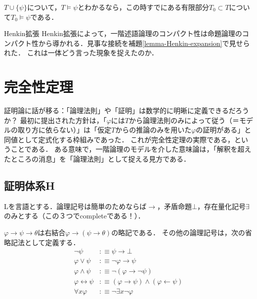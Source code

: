 \documentclass[uplatex, dvipdfmx]{jsreport}
\begin{document}
\begin{corollary}
    $T\cup\{\psi\}$について，$T\vDash\psi$とわかるなら，この時すでにある有限部分$T_0\subset T$について$T_0\vDash\psi$である．
\end{corollary}

\begin{itembox}[l]{Henkin拡張}
    Henkin拡張によって，一階述語論理のコンパクト性は命題論理のコンパクト性から導かれる．見事な接続を補題\ref{lemma-Henkin-expansion}で見せられた．
    これは一体どう言った現象を捉えたのか．
\end{itembox}

\section{完全性定理}

証明論に話が移る：「論理法則」や「証明」は数学的に明晰に定義できるだろうか？
最初に提出された方針は，「$\varphi$には$T$から論理法則のみによって従う（＝モデルの取り方に依らない）」は「仮定$T$からの推論のみを用いた$\varphi$の証明がある」と同値として定式化する枠組みであった．
これが完全性定理の実際である，ということである．
ある意味で，一階論理のモデルを介した意味論は，「解釈を超えたところの消息」を「論理法則」として捉える見方である．

\subsection{証明体系H}

\begin{notation}
    Lを言語とする．論理記号は簡単のためならば$\to$，矛盾命題$\bot$，存在量化記号$\exists$のみとする（この３つでcompleteである！）．

    $\varphi\to\psi\to\theta$は右結合$\varphi\to(\psi\to\theta)$の略記である．
    その他の論理記号は，次の省略記法として定義する．
    \begin{align*}
        \lnot\psi &:\equiv \psi\to\bot\\
        \varphi\lor\psi &:\equiv \lnot\varphi\to\psi\\
        \varphi\land\psi &:\equiv \lnot(\varphi\to\lnot\psi)\\
        \varphi\leftrightarrow\psi &:\equiv (\varphi\rightarrow\psi)\land(\varphi\leftarrow\psi)\\
        \forall x\varphi &:\equiv \lnot\exists x\lnot\varphi
    \end{align*}
\end{notation}
\end{document}
